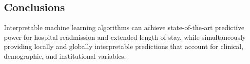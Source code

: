 \subsection{Conclusions}%
Interpretable machine learning algorithms can achieve state-of-the-art 
predictive power for hospital readmission and extended length of stay,
while simultaneously providing locally and globally interpretable predictions
that account for clinical, demographic, and institutional variables.\@
\newpage%